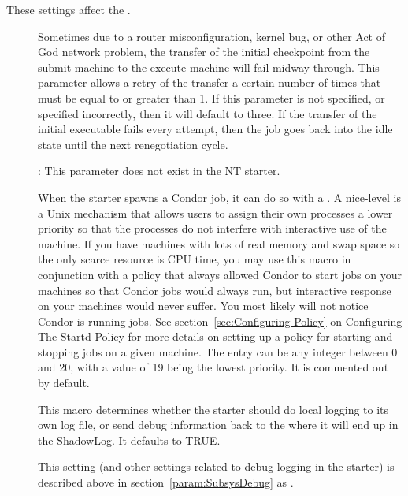 These settings affect the .
\begin{description}

\item[] \label{param:ExecTransferAttempts}
  Sometimes due to a router misconfiguration, kernel bug, or other Act
  of God network problem, the transfer of the initial checkpoint from
  the submit machine to the execute machine will fail midway through.
  This parameter allows a retry of the transfer a certain number of times
  that must be equal to or greater than 1. If this parameter is not
  specified, or specified incorrectly, then it will default to three.
  If the transfer of the initial executable fails every attempt, then
  the job goes back into the idle state until the next renegotiation
  cycle.

  \Note: This parameter does not exist in the NT starter.

\item[] \label{param:JobReniceIncrement}
  When the starter spawns a Condor job, it can do so with a
  .  
  A nice-level is a
  Unix mechanism that allows users to assign their own processes a lower 
  priority so that the processes do not interfere with interactive use of the
  machine.
  If you have machines with lots
  of real memory and swap space so the only scarce resource is CPU
  time, you may use this macro in conjunction with a policy that
  always allowed Condor to start jobs on your machines so that Condor
  jobs would always run, but interactive response on your machines
  would never suffer.  You most likely will not notice Condor is
  running jobs.  See section~\ref{sec:Configuring-Policy} on
  Configuring The Startd Policy for more details on setting up a
  policy for starting and stopping jobs on a given machine.  The entry
  can be any integer between 0 and 20, with a value of 19 being
  the lowest priority.  It is commented out by default.

\item[]
  \label{param:StarterLocalLogging} This macro determines whether the
  starter should do local logging to its own log file, or send debug
  information back to the  where it will end up in the
  ShadowLog.  It defaults to TRUE.

\item[] \label{param:StarterDebug} This setting
  (and other settings related to debug logging in the starter) is
  described above in section~\ref{param:SubsysDebug} as
  .


\end{description}
